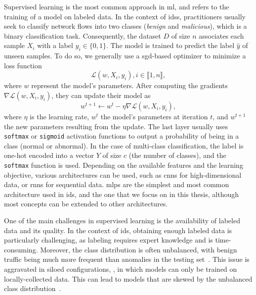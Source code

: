 Supervised learning is the most common approach in \gls{ml}, and refers to the training of a model on labeled data.
In the context of \glspl{ids}, practitioners usually seek to classify network flows into two classes (\emph{benign} and \emph{malicious}), which is a binary classification task.
Consequently, the dataset $D$ of size $n$ associates each sample $X_i$ with a label $y_i \in \lbrace 0,1 \rbrace $.
The model is trained to predict the label $\hat{y}$ of unseen samples.
To do so, we generally use a \gls{sgd}-based optimizer to minimize a loss function
\begin{equation} \label{eq:bg.loss}
  \mathcal{L}(w, X_i, y_i), i \in \llbracket 1, n \rrbracket,
\end{equation}
where $w$ represent the model's parameters.
After computing the gradients $\nabla \mathcal{L}(w, X_i, y_i)$, they can update their model as
\begin{equation} \label{eq:bg.update}
  w^{t+1} \gets w^t - \eta \nabla \mathcal{L}(w, X_i, y_i),
\end{equation}
where $\eta$ is the learning rate, $w^t$ the model's parameters at iteration $t$, and $w^{t+1}$ the new parameters resulting from the update.
The last layer usually uses \texttt{softmax} or \texttt{sigmoid} activation functions to output a probability of being in a class (normal or abnormal).
In the case of multi-class classification, the label is one-hot encoded\footnotemark{} into a vector $Y$ of size $c$ (the number of classes), and the \texttt{softmax} function is used.
Depending on the available features and the learning objective, various architectures can be used, such as \glspl{cnn} for high-dimensional data, or \glspl{rnn} for sequential data.
\Glspl{mlp} are the simplest and most common architecture used in \gls{ids}, and the one that we focus on in this thesis, although most concepts can be extended to other architectures.


One of the main challenges in supervised learning is the availability of labeled data and its quality.
In the context of \gls{ids}, obtaining enough labeled data is particularly challenging, as labeling requires expert knowledge and is time-consuming.
Moreover, the class distribution is often unbalanced, with benign traffic being much more frequent than anomalies in the testing set~\cite{chandola_Anomalydetectionsurvey_2009}.
This issue is aggravated in siloed configurations, \ie, in which models can only be trained on locally-collected data.
This can lead to models that are skewed by the unbalanced class distribution~\cite{campos_EvaluatingFederatedLearning_2022}.

